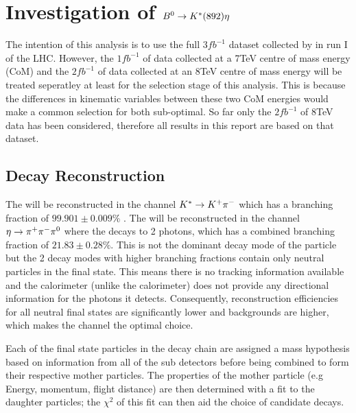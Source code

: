 
\section{Investigation of ${{B}^0} \rightarrow {\ensuremath{{K}^*}}(892) \eta$}
\label{sec:Analysis}


The intention of this analysis is to use the full $3fb^{-1}$ dataset collected by \lhcb in run I of the LHC.  However, the $1fb^{-1}$ of data collected at a 7TeV centre of mass energy (CoM) and the $2fb^{-1}$ of data collected at an 8TeV centre of mass energy will be treated seperatley at least for the selection stage of this analysis.  This is because the differences in kinematic variables between these two CoM energies would make a common selection for both sub-optimal. So far only the $2fb^{-1}$ of 8TeV data has been considered, therefore all results in this report are based on that dataset.

\subsection{Decay Reconstruction}
\label{sec:Decay Reconstruction}
The \Kstar will be reconstructed in the channel ${{K}^*} \rightarrow {\ensuremath{{K}^+}}{\ensuremath{{\pi}^-}}$ which has a branching fraction of $99.901\pm0.009\%$ \cite{PDG2014}.  The \etaz will be reconstructed in the channel $\eta \rightarrow {\ensuremath{{\pi}^+}}{\ensuremath{{\pi}^-}}{\ensuremath{{\pi}^0}}$ where the \piz decays to 2 photons, which has a combined branching fraction of $21.83\pm0.28\%$\cite{PDG2014}.  This is not the dominant decay mode of the \etaz particle but the 2 decay modes with higher branching fractions contain only neutral particles in the final state.  This means there is no tracking information available and the \lhcb calorimeter (unlike the \atlas calorimeter) does not provide any directional information for the photons it detects.  Consequently, reconstruction efficiencies for all neutral final states are significantly lower and backgrounds are higher, which makes the \pip\pim\piz channel the optimal choice.  

Each of the final state particles in the decay chain are assigned a mass hypothesis based on information from all of the \lhcb sub detectors before being combined to form their respective mother particles.  The properties of the mother particle (e.g Energy, momentum, flight distance) are then determined with a fit to the daughter particles;   the $\chi^2$ of this fit can then aid the choice of candidate decays.

